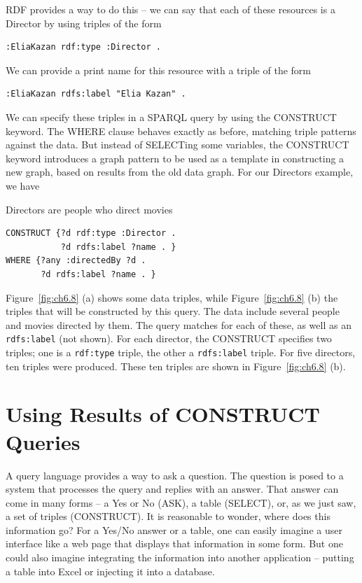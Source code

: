 RDF provides a way to do this -- we can say that each of these resources
is a Director by using triples of the form

\begin{lstlisting}
:EliaKazan rdf:type :Director .
\end{lstlisting}

We can provide a print name for this resource with a triple of the form

\begin{lstlisting}
:EliaKazan rdfs:label "Elia Kazan" .
\end{lstlisting}

We can specify these triples in a SPARQL query by using the CONSTRUCT
keyword. The WHERE clause behaves exactly as before, matching triple
patterns against the data. But instead of SELECTing some variables, the
CONSTRUCT keyword introduces a graph pattern to be used as a template in
constructing a new graph, based on results from the old data graph. For
our Directors example, we have

\begin{query}Directors are people who direct movies\end{query}
\begin{lstlisting}
CONSTRUCT {?d rdf:type :Director .
           ?d rdfs:label ?name . }
WHERE {?any :directedBy ?d .
       ?d rdfs:label ?name . }
\end{lstlisting}

Figure~\ref{fig:ch6.8} (a) shows some data triples, while Figure~\ref{fig:ch6.8} (b) the triples
that will be constructed by this query. The data include several people
and movies directed by them. The query matches for each of these, as
well as an \texttt{rdfs:label} (not shown). For each director, the CONSTRUCT
specifies two triples; one is a \texttt{rdf:type} triple, the other a \texttt{rdfs:label}
triple. For five directors, ten triples were produced. These ten triples
are shown in Figure~\ref{fig:ch6.8} (b).

\section{Using Results of CONSTRUCT Queries}

A query language provides a way to ask a question. The question is posed
to a system that processes the query and replies with an answer. That
answer can come in many forms -- a Yes or No (ASK), a table (SELECT),
or, as we just saw, a set of triples (CONSTRUCT). It is reasonable to
wonder, where does this information go? For a Yes/No answer or a table,
one can easily imagine a user interface like a web page that displays
that information in some form. But one could also imagine integrating
the information into another application -- putting a table into Excel
or injecting it into a database.

